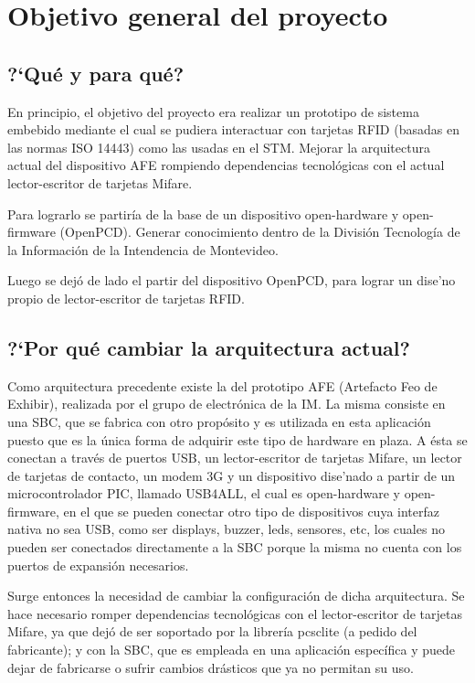 \chapter{Objetivo general del proyecto}

\section{?`Qu\'e y para qu\'e?}

En principio, el objetivo del proyecto era realizar un prototipo de sistema embebido mediante el cual se pudiera interactuar con tarjetas RFID (basadas en las normas ISO 14443) como las usadas en el STM.
Mejorar la arquitectura actual del dispositivo AFE rompiendo dependencias tecnol\'ogicas con el actual lector-escritor de tarjetas Mifare.

Para lograrlo se partir\'ia de la base de un dispositivo open-hardware y open-firmware (OpenPCD).
Generar conocimiento dentro de la Divisi\'on Tecnolog\'ia de la Informaci\'on de la Intendencia de Montevideo.

Luego se dej\'o de lado el partir del dispositivo OpenPCD, para lograr un dise'no propio de lector-escritor de tarjetas RFID.

\section{?`Por qu\'e cambiar la arquitectura actual?}

Como arquitectura precedente existe la del prototipo AFE (Artefacto Feo de Exhibir), realizada por el grupo de electr\'onica de la IM. La misma consiste en una SBC, que se fabrica con otro prop\'osito y es utilizada en esta aplicaci\'on puesto que es la \'unica forma de adquirir este tipo de hardware en plaza. A \'esta se conectan a trav\'es de puertos USB, un lector-escritor de tarjetas Mifare, un lector de tarjetas de contacto, un modem 3G y un dispositivo dise'nado a partir de un microcontrolador PIC, llamado USB4ALL, el cual es open-hardware y open-firmware, en el que se pueden conectar otro tipo de dispositivos cuya interfaz nativa no sea USB, como ser displays, buzzer, leds, sensores, etc, los cuales no pueden ser conectados directamente a la SBC porque la misma no cuenta con los puertos de expansi\'on necesarios.

Surge entonces la necesidad de cambiar la configuraci\'on de dicha arquitectura. Se hace necesario romper dependencias tecnol\'ogicas con el lector-escritor de tarjetas Mifare, ya que dej\'o de ser soportado por la librer\'ia pcsclite (a pedido del fabricante); y con la SBC, que es empleada en una aplicaci\'on espec\'ifica y puede dejar de fabricarse o sufrir cambios dr\'asticos que ya no permitan su uso.


